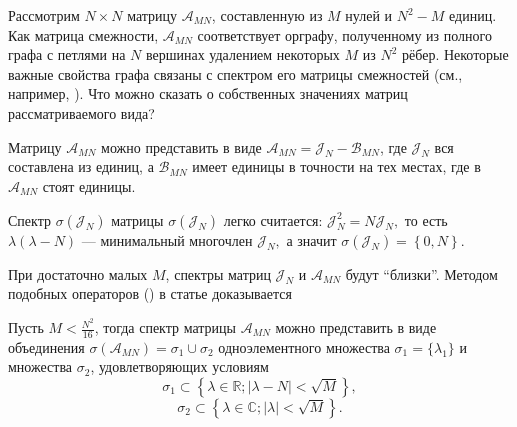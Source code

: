 Рассмотрим \( N\times N \) матрицу \( \mathscr{A}_{MN} \),
составленную из \( M \) нулей и \( N^2 - M \) единиц.
Как матрица смежности, \( \mathscr{A}_{MN} \) соответствует орграфу,
полученному из полного графа с петлями на \( N \) вершинах
удалением некоторых \( M \) из \( N^2 \) рёбер.
Некоторые важные свойства графа связаны с спектром его матрицы смежностей
(см., например, \cite{epidemic}).
Что можно сказать о собственных значениях матриц рассматриваемого вида?

Матрицу \( \mathscr{A}_{MN} \) можно представить в виде
\( \mathscr{A}_{MN} = \mathcal{J}_N - \mathscr{B}_{MN} \),
где \( \mathcal{J}_N \) вся составлена из единиц,
а \( \mathscr{B}_{MN} \) имеет единицы в точности на тех местах, где в \( \mathscr{A}_{MN} \) стоят единицы.

Спектр \( \sigma\left( \mathcal{J}_N \right) \)
матрицы \( \sigma\left(\mathcal{J}_N\right) \) легко считается:
\( \mathcal{J}_N^2 = N \mathcal{J}_N, \) то есть
\( \lambda(\lambda - N) \text{ --- минимальный многочлен } \mathcal{J}_N, \) а значит
\( \sigma\left( \mathcal{J}_N \right) = \left\{ 0,N \right\}. \)

При достаточно малых \( M \),
спектры матриц \( \mathcal{J}_N \) и \( \mathscr{A}_{MN} \) будут ``близки''.
Методом подобных операторов (\cite{baskakov-harmonic}\cite{baskakov-split})
в статье доказывается
\begin{thm*}
    Пусть \( M < \frac{N^2}{16} \),
    тогда спектр матрицы \( \mathscr{A}_{MN} \) можно представить в виде
    объединения \( \sigma\left(\mathscr{A}_{MN}\right) = \sigma_1 \cup \sigma_2 \)
    одноэлементного множества \( \sigma_1=\{\lambda_1\} \)
    и множества \( \sigma_2 \), удовлетворяющих условиям
    \[ \sigma_1 \subset \left\{ \lambda\in\mathbb{R}; \lvert \lambda - N \rvert < \sqrt{M} \right\}, \]
    \[ \sigma_2 \subset \left\{ \lambda\in\mathbb{C}; \lvert \lambda \rvert < \sqrt{M} \right\}. \]
\end{thm*}
